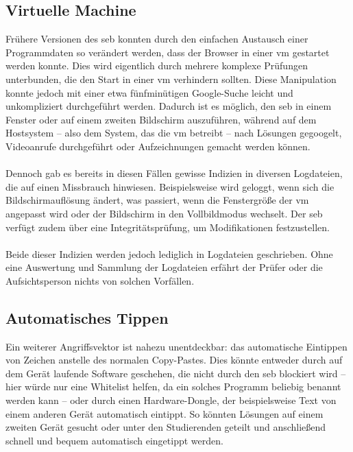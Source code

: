 \subsection{Virtuelle Machine}
Frühere Versionen des \gls{seb} konnten durch den einfachen Austausch einer Programmdaten so verändert werden, dass der Browser in einer \gls{vm} gestartet werden konnte. 
Dies wird eigentlich durch mehrere komplexe Prüfungen unterbunden, die den Start in einer \gls{vm} verhindern sollten. 
Diese Manipulation konnte jedoch mit einer etwa fünfminütigen Google-Suche leicht und unkompliziert durchgeführt werden. 
Dadurch ist es möglich, den \gls{seb} in einem Fenster oder auf einem zweiten Bildschirm auszuführen, während auf dem Hostsystem – also dem System, das die \gls{vm} betreibt – nach Lösungen gegoogelt, Videoanrufe durchgeführt oder Aufzeichnungen gemacht werden können.\\
\\
Dennoch gab es bereits in diesen Fällen gewisse Indizien in diversen Logdateien, die auf einen Missbrauch hinwiesen. 
Beispielsweise wird geloggt, wenn sich die Bildschirmauflösung ändert, was passiert, wenn die Fenstergröße der \gls{vm} angepasst wird oder der Bildschirm in den Vollbildmodus wechselt. 
Der \gls{seb} verfügt zudem über eine Integritätsprüfung, um Modifikationen festzustellen.\\
\\
Beide dieser Indizien werden jedoch lediglich in Logdateien geschrieben. 
Ohne eine Auswertung und Sammlung der Logdateien erfährt der Prüfer oder die Aufsichtsperson nichts von solchen Vorfällen.
\subsection{Automatisches Tippen}
Ein weiterer Angriffsvektor ist nahezu unentdeckbar: das automatische Eintippen von Zeichen anstelle des normalen Copy-Pastes. 
Dies könnte entweder durch auf dem Gerät laufende Software geschehen, die nicht durch den \gls{seb} blockiert wird – hier würde nur eine Whitelist helfen, da ein solches Programm beliebig benannt werden kann – oder durch einen Hardware-Dongle, der beispielsweise Text von einem anderen Gerät automatisch eintippt. 
So könnten Lösungen auf einem zweiten Gerät gesucht oder unter den Studierenden geteilt und anschließend schnell und bequem automatisch eingetippt werden.

